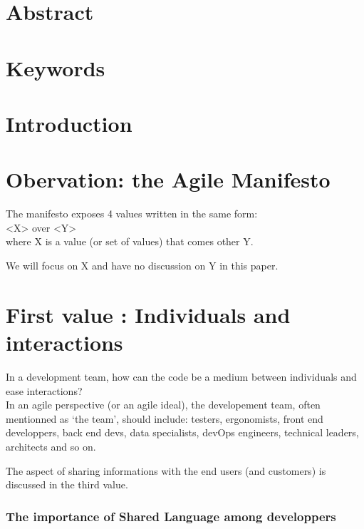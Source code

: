 \section{Abstract}\label{abstract}

\section{Keywords}\label{keywords}

\section{Introduction}\label{introduction}

\section{Obervation: the Agile
Manifesto}\label{obervation-the-agile-manifesto}

The manifesto exposes 4 values written in the same
form:\\\textless{}X\textgreater{} over \textless{}Y\textgreater{}\\where
X is a value (or set of values) that comes other Y.

We will focus on X and have no discussion on Y in this paper.

\section{First value : Individuals and
interactions}\label{first-value-individuals-and-interactions}

In a development team, how can the code be a medium between individuals
and ease interactions?\\In an agile perspective (or an agile ideal), the
developement team, often mentionned as `the team', should include:
testers, ergonomists, front end developpers, back end devs, data
specialists, devOps engineers, technical leaders, architects and so on.

The aspect of sharing informations with the end users (and customers) is
discussed in the third value.

\subsubsection{The importance of Shared Language among
developpers}\label{the-importance-of-shared-language-among-developpers}


